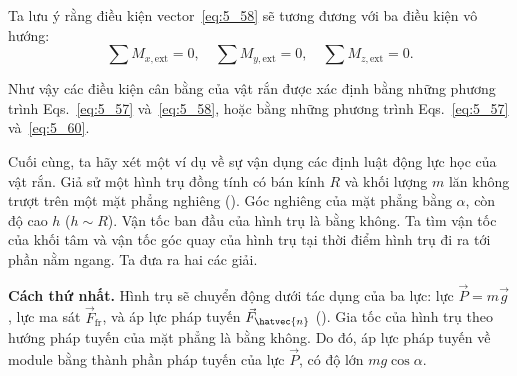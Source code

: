 Ta lưu ý rằng điều kiện vector~\eqref{eq:5_58} sẽ tương đương với ba điều kiện vô hướng:
\begin{equation}\label{eq:5_60}
	\sum M_{x,\text{ext}} = 0 ,\quad \sum M_{y,\text{ext}} = 0 ,\quad \sum M_{z,\text{ext}} = 0.
\end{equation}

Như vậy các điều kiện cân bằng của vật rắn được xác định bằng những phương trình Eqs.~\eqref{eq:5_57} và~\eqref{eq:5_58}, hoặc bằng những phương trình  Eqs.~\eqref{eq:5_57} và~\eqref{eq:5_60}.

Cuối cùng, ta hãy xét một ví dụ về sự vận dụng các định luật động lực học của vật rắn. Giả sử một hình trụ đồng tính có bán kính $R$ và khối lượng $m$ lăn không trượt trên một mặt phẳng nghiêng (). Góc nghiêng của mặt phẳng bằng $\alpha$, còn độ cao $h$ ($h\sim R$). Vận tốc ban đầu của hình trụ là bằng không. Ta tìm vận tốc của khối tâm và vận tốc góc quay của hình trụ tại thời điểm hình trụ đi ra tới phần nằm ngang. Ta đưa ra hai các giải.

\textbf{Cách thứ nhất.} Hình trụ sẽ chuyển động dưới tác dụng của ba lực: lực $\vec{P}=m\vec{g}$, lực ma sát $\vec{F}_{\text{fr}}$, và áp lực pháp tuyến $\vec{F}_{\hatvec{n}}$ (). Gia tốc của hình trụ theo hướng pháp tuyến của mặt phẳng là bằng không. Do đó, áp lực pháp tuyến về module bằng thành phần pháp tuyến của lực $\vec{P}$, có độ lớn $mg\cos\alpha$. %


